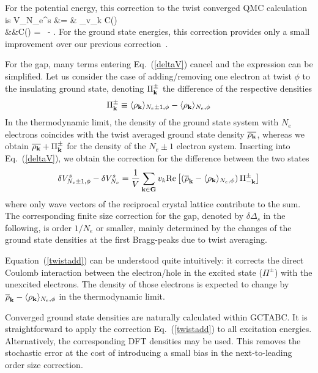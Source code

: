 For the potential energy, this correction to the twist converged QMC calculation is
\bea
\delta V_{N_e}^s &= &
  \sum_\kvec v_k \delta C(\kvec) \nonumber \\
&&\delta C(\kvec) =
\overline{\rho_\kvec } \, \overline{\rho_{-\kvec}}
- \overline{\rho_\kvec \rho_{-\kvec}} .
\label{deltaV}
\eea
For the ground state energies, this correction provides only a small improvement over our previous correction~\cite{fse,finitesize}.

For the gap, many terms entering Eq.~(\ref{deltaV}) cancel and the expression can be simplified. Let us consider the case of adding/removing one electron at twist $\phi$ to
the insulating ground state, denoting $\Pi_{\bf k}^{\pm}$ the difference of the respective densities
\begin{equation}
\Pi_{\bf k}^{\pm} \equiv
\langle \rho_{\bf k}  \rangle_{N_e \pm 1,\phi} - \langle \rho_{\bf k}  \rangle_{N_e,\phi}
\end{equation}
In the thermodynamic limit, the density of the ground state system with $N_e$ electrons
coincides with the twist averaged ground state density $\overline{\rho_{\bf k}}$, whereas
we obtain $\overline{\rho_{\bf k}}+\Pi_{\bf k}^{\pm}$
for the density of the $N_e \pm 1$ electron system.
Inserting into Eq.~(\ref{deltaV}), we obtain the correction for the difference between the two states
\begin{equation}
\delta V_{N_e \pm 1,\phi}^s - \delta V_{N_e}^s
= \frac{1}{V} \sum_{{\bf k}\in {\bf G}} v_k \text{Re}
\left[ \left( \overline{\rho}_{\bf k}
- \langle \rho_{\bf k} \rangle_{N_e,\phi} \right) \Pi_{-{\bf k}}^{\pm}
\right]
\label{twistadd}
\end{equation}
where only wave vectors of the reciprocal crystal lattice contribute
to the sum.
The corresponding finite size correction for the gap,
denoted by $\delta \Delta_s$ in the following,
is order $1/N_e$ or smaller, mainly determined by the changes
of the ground state densities at the first Bragg-peaks due to twist averaging.

Equation~(\ref{twistadd}) can be understood quite intuitively: it corrects the
direct Coulomb interaction between the electron/hole in the
excited state ($\Pi^\pm$) with the unexcited electrons. The density
of those electrons is expected to change
by $\overline{\rho}_{\bf k} - \langle \rho_{\bf k} \rangle_{N_e,\phi}$
in the thermodynamic limit.

Converged ground state densities are naturally calculated within
GCTABC.  It is straightforward to apply the correction Eq.~(\ref{twistadd})
to all excitation energies.
Alternatively, the corresponding
 DFT densities may be used. This removes the stochastic error at the cost of
introducing a small bias in the next-to-leading order size correction.


